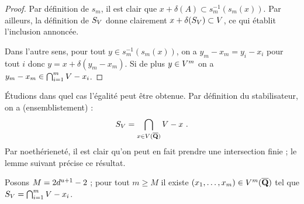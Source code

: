 \begin{proof}
  Par définition de \( s_m \), il est clair que \( x + \delta(A) \subset
    s_m^{-1} ( s_m(x) ) \). Par ailleurs, la définition de \( S_V \) donne
  clairement \( x + \delta(S_V) \subset V \), ce qui établit
  l'inclusion annoncée.

  Dans l'autre sens, pour tout \( y \in s_m^{-1} ( s_m(x) ) \), on a
  \( y_m - x_m = y_i - x_i \) pour tout \( i \) donc \( y = x +
    \delta(y_m - x_m) \). Si de plus \( y \in V^m \) on a \( y_m - x_m \in
    \bigcap_{i=1}^m V - x_i \).
\end{proof}

Étudions dans quel cas l'égalité peut être obtenue. Par définition du
stabilisateur, on a (ensemblistement) :
\begin{equation}
  S_V = \bigcap_{x \in V(\overline{{\mathbf{Q}}})} V - x
  \text{ .}
\end{equation}
Par noethérieneté, il est clair qu'on peut en fait prendre
une intersection finie ; le lemme suivant précise ce résultat.

\begin{lem}
  Posons \( M = 2 d^{u+1} - 2 \) ; pour tout \( m \ge M \) il existe
  \( (x_1, \dots, x_m) \in V^m(\overline{{\mathbf{Q}}}) \) tel que
  \( S_V = \bigcap_{i=1}^m V - x_i \).
\end{lem}

